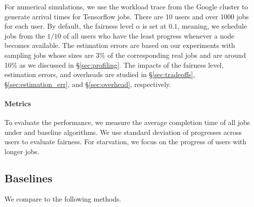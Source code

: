 For numerical simulations, we use the workload trace from the Google cluster \cite{google-traces} to generate arrival times for Tensorflow jobs.
There are 10 users and over 1000 jobs for each user. %
By default, the fairness level $\alpha$ is set at $0.1$, meaning, we schedule jobs from the $1/10$ of all users who have the least progress whenever a node becomes available. The estimation errors are based on our experiments with sampling jobs whose sizes are 3\% of the corresponding real jobs and are around 10\% as we discussed in \S\ref{sec:profiling}. The impacts of the fairness level, estimation errors, and overheads are studied in \S\ref{sec:tradeoffs}, \S\ref{sec:estimation_err}, and \S\ref{sec:overhead}, respectively.

\paragraph{Metrics} %
To evaluate the performance, we measure the average completion time of all jobs under \name and baseline algorithms.
We use standard deviation of progresses across users to evaluate fairness. %
For starvation, we focus on the progress of users with longer jobs. %

\subsection{Baselines} 
\label{sec:baselines}
We compare \name to the following methods.

